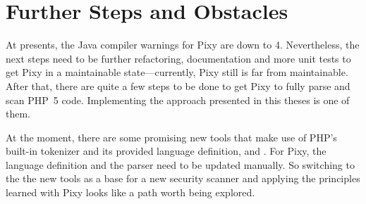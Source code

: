 \section{Further Steps and Obstacles}

At presents, the Java compiler warnings for Pixy are down to 4. Nevertheless, the next steps need to be further refactoring, documentation and more unit tests to get Pixy in a maintainable state---currently, Pixy still is far from maintainable. After that, there are quite a few steps to be done to get Pixy to fully parse and scan PHP~5 code. Implementing the approach presented in this theses is one of them.

At the moment, there are some promising new tools that make use of PHP's built-in tokenizer and its provided language definition, \eg \cite{php-parser-popov} and \cite{php-analyzer}. For Pixy, the language definition and the parser need to be updated manually. So switching to the the new tools as a base for a new security scanner and applying the principles learned with Pixy looks like a path worth being explored.
